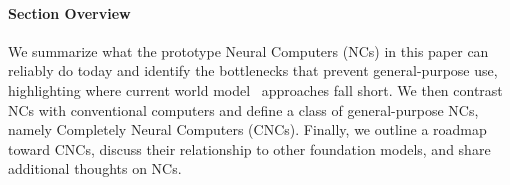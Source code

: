 


\paragraph{Section Overview}
We summarize what the prototype Neural Computers (NCs) in this paper can reliably do today and identify the bottlenecks that prevent general-purpose use, highlighting where current world model~\citep{ha2018world,openai2024sora,polyak2024movie,deepmind_veo_2025} approaches fall short.
We then contrast NCs with conventional computers and define a class of general-purpose NCs, namely Completely Neural Computers (CNCs).
Finally, we outline a roadmap toward CNCs, discuss their relationship to other foundation models, and share additional thoughts on NCs.

